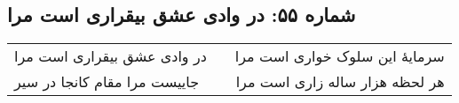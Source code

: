 \begin{center}
\section*{شماره ۵۵: در وادی عشق بیقراری است مرا}
\label{sec:055}
\begin{longtable}{l p{0.5cm} r}
در وادی عشق بیقراری است مرا
&&
سرمایهٔ این سلوک خواری است مرا
\\
جاییست مرا مقام کانجا در سیر
&&
هر لحظه هزار ساله زاری است مرا
\\
\end{longtable}
\end{center}
